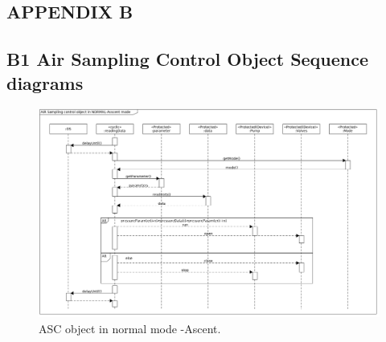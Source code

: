 \begin{landscape}
\section{APPENDIX B} \label{sec:appB}

\subsection*{B1 Air Sampling Control Object Sequence diagrams}
\begin{figure}[H]
    \centering
    \includegraphics[height=0.75\textwidth]{appendix/img/ASC-seq-dia-v1-2-a.png}
    \caption{ASC object in normal mode -Ascent.}
    \label{ASCa}
\end{figure}


\end{landscape}
